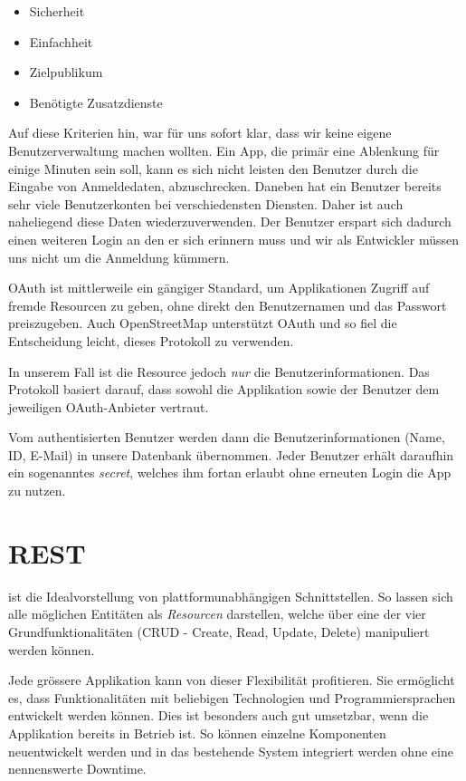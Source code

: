 \begin{itemize}
\item Sicherheit
\item Einfachheit
\item Zielpublikum
\item Benötigte Zusatzdienste
\end{itemize}

Auf diese Kriterien hin, war für uns sofort klar, dass wir keine eigene Benutzerverwaltung machen wollten.
Ein App, die primär eine Ablenkung für einige Minuten sein soll, kann es sich nicht leisten den Benutzer durch die Eingabe von Anmeldedaten, abzuschrecken.
Daneben hat ein Benutzer bereits sehr viele Benutzerkonten bei verschiedensten Diensten.
Daher ist auch naheliegend diese Daten wiederzuverwenden.
Der Benutzer erspart sich dadurch einen weiteren Login an den er sich erinnern muss und wir als Entwickler müssen uns nicht um die Anmeldung kümmern.

\Gls{OAuth} ist mittlerweile ein gängiger Standard, um Applikationen Zugriff auf fremde Resourcen zu geben, ohne direkt den Benutzernamen und das Passwort preiszugeben.
Auch OpenStreetMap unterstützt \gls{OAuth} und so fiel die Entscheidung leicht, dieses Protokoll zu verwenden.

In unserem Fall ist die Resource jedoch \emph{nur} die Benutzerinformationen.
Das Protokoll basiert darauf, dass sowohl die Applikation sowie der Benutzer dem jeweiligen \gls{OAuth}-Anbieter vertraut.

Vom authentisierten Benutzer werden dann die Benutzerinformationen (Name, ID, E-Mail) in unsere Datenbank übernommen.
Jeder Benutzer erhält daraufhin ein sogenanntes \emph{secret}, welches ihm fortan erlaubt ohne erneuten Login die App zu nutzen.


\section{REST}
 ist die Idealvorstellung von plattformunabhängigen Schnittstellen.
So lassen sich alle möglichen Entitäten als \emph{Resourcen} darstellen, welche über eine der vier Grundfunktionalitäten (CRUD - Create, Read, Update, Delete) manipuliert werden können.

Jede grössere Applikation kann von dieser Flexibilität profitieren.
Sie ermöglicht es, dass Funktionalitäten mit beliebigen Technologien und Programmiersprachen entwickelt werden können.
Dies ist besonders auch gut umsetzbar, wenn die Applikation bereits in Betrieb ist.
So können einzelne Komponenten neuentwickelt werden und in das bestehende System integriert werden ohne eine nennenswerte Downtime.

